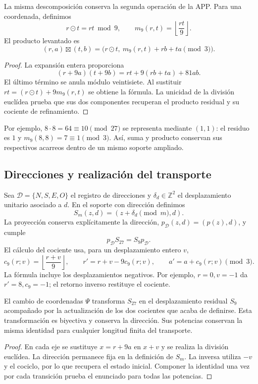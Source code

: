 La misma descomposición conserva la segunda operación de la APP. Para
una coordenada, definimos
\[
 r\odot t=rt\bmod9,\qquad
 m_9(r,t)=\left\lfloor\frac{rt}{9}\right\rfloor.
\]
El producto levantado es
\begin{equation}
 (r,a)\boxtimes(t,b)
 =\bigl(r\odot t,\ m_9(r,t)+rb+ta\pmod3\bigr).
 \label{eq:app-refinamiento-producto}
\end{equation}
\begin{proof}
La expansión entera proporciona
\[
 (r+9a)(t+9b)=rt+9(rb+ta)+81ab.
\]
El último término se anula módulo veintisiete. Al sustituir
$rt=(r\odot t)+9m_9(r,t)$ se obtiene la fórmula. La unicidad de la
división euclídea prueba que sus dos componentes recuperan el producto
residual y su cociente de refinamiento.
\end{proof}
Por ejemplo, $8\cdot8=64\equiv10\pmod{27}$ se representa mediante
$(1,1)$: el residuo es $1$ y
$m_9(8,8)=7\equiv1\pmod3$. Así, suma y producto conservan sus
respectivos acarreos dentro de un mismo soporte ampliado.

\subsection{Direcciones y realización del transporte}

Sea $\mathcal D=\{N,S,E,O\}$ el registro de direcciones y
$\delta_d\in\mathbb Z^2$ el desplazamiento unitario asociado a $d$.
En el soporte con dirección definimos
\[
 S_m(z,d)=(z+\delta_d\pmod m,d).
\]
La proyección conserva explícitamente la dirección,
$p_{\mathcal D}(z,d)=(p(z),d)$, y cumple
\begin{equation}
 p_{\mathcal D}S_{27}=S_9p_{\mathcal D}.
 \label{eq:app-refinamiento-direccion}
\end{equation}
El cálculo del cociente usa, para un desplazamiento entero $v$,
\[
 c_9(r;v)=\left\lfloor\frac{r+v}{9}\right\rfloor,
 \qquad r'=r+v-9c_9(r;v),\qquad
 a'=a+c_9(r;v)\pmod3.
\]
La fórmula incluye los desplazamientos negativos. Por ejemplo,
$r=0,v=-1$ da $r'=8,c_9=-1$; el retorno inverso restituye el cociente.

\begin{proposition}
El cambio de coordenadas $\Psi$ transforma $S_{27}$ en el
desplazamiento residual $S_9$ acompañado por la actualización de los
dos cocientes que acaba de definirse. Esta transformación es biyectiva
y conserva la dirección. Sus potencias conservan la misma identidad
para cualquier longitud finita del transporte.
\end{proposition}
\begin{proof}
En cada eje se sustituye $x=r+9a$ en $x+v$ y se realiza la división
euclídea. La dirección permanece fija en la definición de $S_m$.
La inversa utiliza $-v$ y el cociclo, por lo que recupera el estado
inicial. Componer la identidad una vez por cada transición prueba
el enunciado para todas las potencias.
\end{proof}

